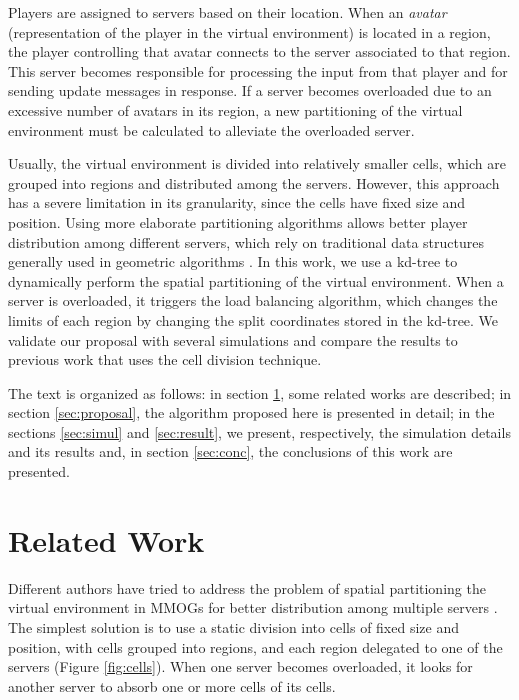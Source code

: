 \documentclass[acmjacm]{acmtrans2m}
\begin{document}
Players are assigned to servers based on their location. When an \emph{avatar} (representation of the player in the virtual environment) is located in a region, the player controlling that avatar connects to the server associated to that region. This server becomes responsible for processing the input from that player and for sending update messages in response. If a server becomes overloaded due to an excessive number of avatars in its region, a new partitioning of the virtual environment must be calculated to alleviate the overloaded server.

Usually, the virtual environment is divided into relatively smaller cells, which are grouped into regions and distributed among the servers. However, this approach has a severe limitation in its granularity, since the cells have fixed size and position. Using more elaborate partitioning algorithms allows better player distribution among different servers, which rely on traditional data structures generally used in geometric algorithms \cite{samet2005}. In this work, we use a kd-tree to dynamically perform the spatial partitioning of the virtual environment. When a server is overloaded, it triggers the load balancing algorithm, which changes the limits of each region by changing the split coordinates stored in the kd-tree. We validate our proposal with several simulations and compare the results to previous work that uses the cell division technique.

The text is organized as follows: in section \ref{context}, some related works are described; in section \ref{sec:proposal}, the algorithm proposed here is presented in detail; in the sections \ref{sec:simul} and \ref{sec:result}, we present, respectively, the simulation details and its results and, in section \ref{sec:conc}, the conclusions of this work are presented.


\section{Related Work}
\label{context}

Different authors have tried to address the problem of spatial partitioning the virtual environment in MMOGs for better distribution among multiple servers \cite{ahmed2008mol,bezerra2009lbs}. The simplest solution is to use a static division into cells of fixed size and position, with cells grouped into regions, and each region delegated to one of the servers (Figure \ref{fig:cells}). When one server becomes overloaded, it looks for another server to absorb one or more cells of its cells.
\end{document}
